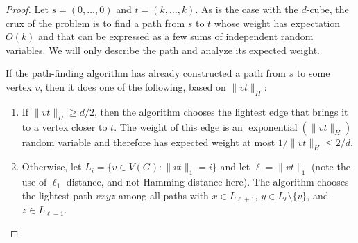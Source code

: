 \documentclass{patmorin}
\DeclareMathOperator{\exponential}{exponential}
\begin{document}
\begin{proof}
Let $s=(0,\ldots,0)$ and $t=(k,\ldots,k)$.  As is the case with the
$d$-cube, the crux of the problem is to find a path from $s$ to $t$
whose weight has expectation $O(k)$ and that can be expressed as a few
sums of independent random variables. We will only describe the path and
analyze its expected weight.

If the path-finding algorithm has already constructed a path from $s$ to
some vertex $v$, then it does one of the following, based on $\|vt\|_H$:
\begin{enumerate}

  \item If $\|vt\|_H \ge d/2$, then the algorithm chooses the lightest 
    edge that brings it to a vertex closer to $t$.  The weight of this
    edge is an $\exponential(\|vt\|_H)$ random variable and therefore has
    expected weight at most $1/\|vt\|_H \le 2/d$.

  \item Otherwise, let $L_i = \{v\in V(G): \|vt\|_1=i\}$ and let
    $\ell=\|vt\|_1$ (note the use of $\ell_1$ distance, and not Hamming
    distance here).  The algorithm chooses the lightest path $vxyz$ among
    all paths with $x\in L_{\ell+1}$,  $y\in L_{\ell}\setminus\{v\}$,
    and $z\in L_{\ell-1}$.


\end{enumerate}
\end{proof}
\end{document}
